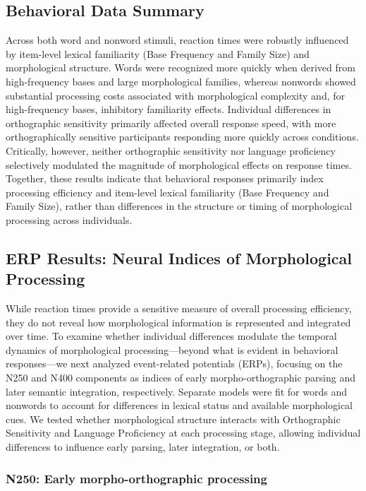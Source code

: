 \documentclass[preprint,12pt, authoryear, review]{elsarticle}
\begin{document}
	\subsection{Behavioral Data Summary}
	Across both word and nonword stimuli, reaction times were robustly influenced by item-level lexical familiarity (Base Frequency and Family Size) and morphological structure. Words were recognized more quickly when derived from high-frequency bases and large morphological families, whereas nonwords showed substantial processing costs associated with morphological complexity and, for high-frequency bases, inhibitory familiarity effects. Individual differences in orthographic sensitivity primarily affected overall response speed, with more orthographically sensitive participants responding more quickly across conditions. Critically, however, neither orthographic sensitivity nor language proficiency selectively modulated the magnitude of morphological effects on response times. Together, these results indicate that behavioral responses primarily index processing efficiency and item-level lexical familiarity (Base Frequency and Family Size), rather than differences in the structure or timing of morphological processing across individuals.

	\subsection{ERP Results: Neural Indices of Morphological Processing}
	While reaction times provide a sensitive measure of overall processing efficiency, they do not reveal how morphological information is represented and integrated over time. To examine whether individual differences modulate the temporal dynamics of morphological processing—beyond what is evident in behavioral responses—we next analyzed event-related potentials (ERPs), focusing on the N250 and N400 components as indices of early morpho-orthographic parsing and later semantic integration, respectively. Separate models were fit for words and nonwords to account for differences in lexical status and available morphological cues. We tested whether morphological structure interacts with Orthographic Sensitivity and Language Proficiency at each processing stage, allowing individual differences to influence early parsing, later integration, or both.
	
	\subsubsection{N250: Early morpho-orthographic processing}
\end{document}
